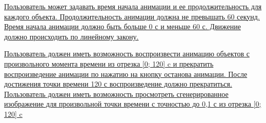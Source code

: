 \uline{\mbox{\hspace*{1.25cm}} Пользователь может задавать время начала анимации и ее продолжительность для каждого объекта. Продолжительность анимации должна не превышать 60 секунд. Время начала анимации должно быть больше 0 с и меньше 60 с. Движение должно происходить по линейному закону.\hfill}


\uline{\mbox{\hspace*{1.25cm}} Пользователь должен иметь возможность воспроизвести анимацию объектов с произвольного момента времени из отрезка [0; 120] c  и прекратить воспроизведение анимации по нажатию на кнопку останова анимации. После достижения точки времени 120 с воспроизведение должно прекратиться. Пользователь должен иметь возможность просмотреть сгенерированное изображение для произвольной точки времени с точностью до 0,1 с из отрезка [0; 120] c \hfill}


\endgroup
\normalsize
